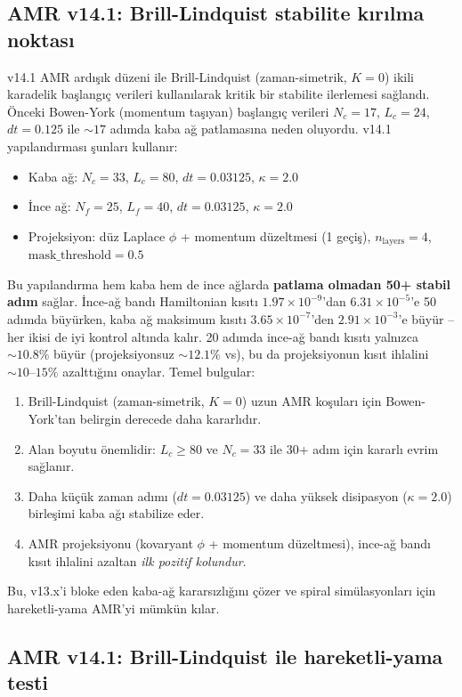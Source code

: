 \subsection{AMR v14.1: Brill-Lindquist stabilite kırılma noktası}

v14.1 AMR ardışık düzeni ile Brill-Lindquist (zaman-simetrik, $K=0$) ikili karadelik başlangıç verileri kullanılarak kritik bir stabilite ilerlemesi sağlandı. Önceki Bowen-York (momentum taşıyan) başlangıç verileri $N_c=17$, $L_c=24$, $dt=0.125$ ile $\sim 17$ adımda kaba ağ patlamasına neden oluyordu. v14.1 yapılandırması şunları kullanır:
\begin{itemize}
    \item Kaba ağ: $N_c=33$, $L_c=80$, $dt=0.03125$, $\kappa=2.0$
    \item İnce ağ: $N_f=25$, $L_f=40$, $dt=0.03125$, $\kappa=2.0$
    \item Projeksiyon: düz Laplace $\phi$ + momentum düzeltmesi (1 geçiş), $n_{\text{layers}}=4$, $\text{mask\_threshold}=0.5$
\end{itemize}
Bu yapılandırma hem kaba hem de ince ağlarda \textbf{patlama olmadan 50+ stabil adım} sağlar. İnce-ağ bandı Hamiltonian kısıtı $1.97\times 10^{-9}$'dan $6.31\times 10^{-5}$'e 50 adımda büyürken, kaba ağ maksimum kısıtı $3.65\times 10^{-7}$'den $2.91\times 10^{-3}$'e büyür -- her ikisi de iyi kontrol altında kalır. 20 adımda ince-ağ bandı kısıtı yalnızca $\sim 10.8\%$ büyür (projeksiyonsuz $\sim 12.1\%$ vs), bu da projeksiyonun kısıt ihlalini $\sim 10\text{--}15\%$ azalttığını onaylar. Temel bulgular:
\begin{enumerate}
    \item Brill-Lindquist (zaman-simetrik, $K=0$) uzun AMR koşuları için Bowen-York'tan belirgin derecede daha kararlıdır.
    \item Alan boyutu önemlidir: $L_c \ge 80$ ve $N_c=33$ ile 30+ adım için kararlı evrim sağlanır.
    \item Daha küçük zaman adımı ($dt=0.03125$) ve daha yüksek disipasyon ($\kappa=2.0$) birleşimi kaba ağı stabilize eder.
    \item AMR projeksiyonu (kovaryant $\phi$ + momentum düzeltmesi), ince-ağ bandı kısıt ihlalini azaltan \emph{ilk pozitif kolundur}.
\end{enumerate}
Bu, v13.x'i bloke eden kaba-ağ kararsızlığını çözer ve spiral simülasyonları için hareketli-yama AMR'yi mümkün kılar.

\subsection{AMR v14.1: Brill-Lindquist ile hareketli-yama testi}
\label{sec:amr-moving-patch}

